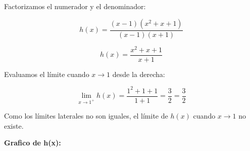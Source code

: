 \documentclass[answers]{exam} %
\begin{document}
\begin{questions}
\begin{solution}
        Factorizamos el numerador y el denominador:
    
        \[
        h(x) = \frac{(x - 1)(x^2 + x + 1)}{(x - 1)(x + 1)}
        \]
    
        \[
        h(x) = \frac{x^2 + x + 1}{x + 1}
        \]
    
        Evaluamos el límite cuando \( x \rightarrow 1 \) desde la derecha:
    
        \[
        \lim_{{x \to 1^+}} h(x) = \frac{1^2 + 1 + 1}{1 + 1} = \frac{3}{2} = \frac{3}{2}
        \]
    
        Como los límites laterales no son iguales, el límite de \( h(x) \) cuando \( x \rightarrow 1 \) no existe.
        \end{solution}
    
	\large\textbf{Grafico de h(x):}
    \begin{solution}
	\end{solution}


	\vspace{0.5cm}


\end{questions}
\end{document}
